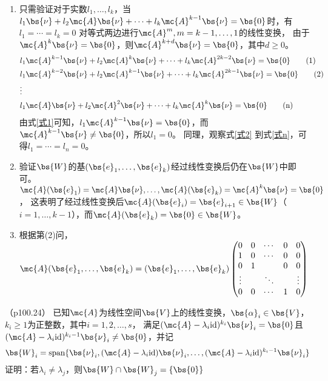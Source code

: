 \documentclass[12pt, a4paper, oneside, UTF8]{ctexbook}
\begin{document}
\begin{solution}
    \begin{enumerate}[label=(\arabic*)]
        \item 只需验证对于实数$l_1,\ldots,l_k$，当$l_1\bs{\nu}+l_2 \mc{A}\bs{\nu}+\cdots+l_k\mc{A}^{k-1}\bs{\nu} = \bs{0}$时，有$l_1=\cdots=l_k=0$
        对等式两边进行$\mc{A}^m, m=k-1,\ldots,1$的线性变换， 由于$\mc{A}^k\bs{\nu}=\bs{0}$，则$\mc{A}^{k+d}\bs{\nu}=\bs{0}$，其中$d \geq 0$。
        \begin{align*}
            &l_1\mc{A}^{k-1}\bs{\nu}+l_2\mc{A}^{k}\bs{\nu}+\cdots+l_k\mc{A}^{2k-2}\bs{\nu}=\bs{0}  \tag{1} \label{式1}\\
            &l_1\mc{A}^{k-2}\bs{\nu}+l_2\mc{A}^{k-1}\bs{\nu}+\cdots+l_k\mc{A}^{2k-1}\bs{\nu}=\bs{0}  \tag{2} \label{式2}\\
            &\vdots \notag \\
            &l_1\mc{A}\bs{\nu}+l_2\mc{A}^{2}\bs{\nu}+\cdots+l_k\mc{A}^{k}\bs{\nu}=\bs{0}  \tag{n} \label{式n}
        \end{align*}
        由式\eqref{式1}可知，$l_1\mc{A}^{k-1}\bs{\nu}=\bs{0}$，而$\mc{A}^{k-1}\bs{\nu} \neq \bs{0}$，所以$l_1=0$。
        同理，观察式\eqref{式2} 到式\eqref{式n}，可得$l_1=\cdots=l_n=0$。
        \item 验证$\bs{W}$的基$(\bs{e}_1,\ldots,\bs{e}_k)$经过线性变换后仍在$\bs{W}$中即可。$\mc{A}(\bs{e}_1)=\mc{A}\bs{\nu},\ldots,\mc{A}(\bs{e}_k)=\mc{A}^{k}\bs{\nu}=\bs{0}$，
        这表明了经过线性变换后$\mc{A}(\bs{e}_i)=\bs{e}_{i+1} \in \bs{W}$（$i=1,\ldots,k-1$），而$\mc{A}(\bs{e}_k)=\bs{0} \in \bs{W}$。
        \item 根据第(2)问，$\mc{A}(\bs{e}_1,\ldots,\bs{e}_k)=(\bs{e}_1,\ldots,\bs{e}_k)\begin{pmatrix}
            0 & 0 &\cdots& 0 & 0\\
            1 & 0 & \cdots& 0 & 0 \\
            0 & 1 &  & 0 & 0  \\
            \vdots& & \ddots & & \vdots \\
            0 & 0 & \cdots & 1 & 0
        \end{pmatrix}$
    \end{enumerate}
\end{solution}

\begin{question}（p100.24）
已知$\mc{A}$为线性空间$\bs{V}$上的线性变换，$\bs{\alpha}_i \in \bs{V}$，$k_i \geq 1$为正整数，其中$i=1,2,\ldots,s$，
满足$(\mc{A}-\lambda_i \mathrm{id})^{k_i}\bs{\nu}_i = \bs{0}$且$(\mc{A}-\lambda_i \mathrm{id})^{k_i-1}\bs{\nu}_i \neq \bs{0}$，并记
\begin{align*}
    \bs{W}_i=\mathrm{span}\{\bs{\nu}_i,(\mc{A}-\lambda_i \mathrm{id})\bs{\nu}_i,\ldots,(\mc{A}-\lambda_i \mathrm{id})^{k_i-1}\bs{\nu}_i\}
\end{align*}
证明：若$\lambda_i \neq \lambda_j$，则$\bs{W} \cap \bs{W}_j =\{\bs{0}\}$
\end{question}
\end{document}
